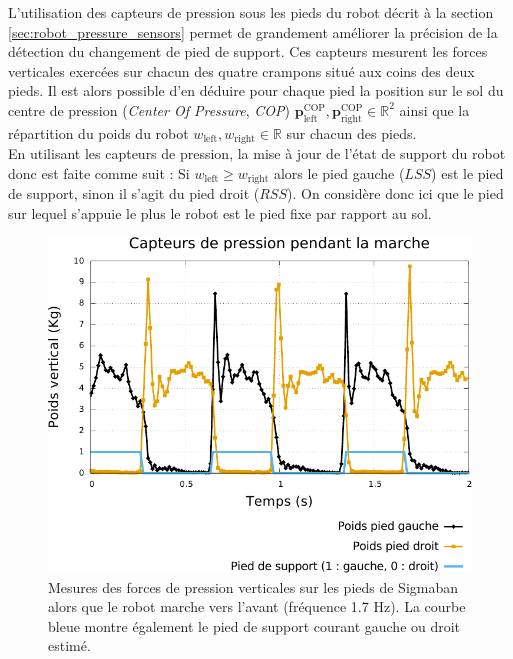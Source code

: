 L'utilisation des capteurs de pression sous les pieds du robot 
décrit à la section \ref{sec:robot_pressure_sensors} permet de grandement 
améliorer la précision de la détection du changement de pied de support.
Ces capteurs mesurent les forces verticales exercées sur chacun des quatre 
crampons situé aux coins des deux pieds.
Il est alors possible d'en déduire pour chaque pied la position
sur le sol du centre de pression (\textit{Center Of Pressure}, \textit{COP}) 
$\bm{p}_{\text{left}}^{\text{COP}},\bm{p}_{\text{right}}^{\text{COP}} \in \mathbb{R}^2$ ainsi 
que la répartition du poids du robot $w_{\text{left}}, w_{\text{right}}\in \mathbb{R}$ 
sur chacun des pieds.\\

En utilisant les capteurs de pression, la mise à jour
de l'état de support du robot donc est faite comme suit :
Si $w_{\text{left}} \geqslant w_{\text{right}}$ alors 
le pied gauche ($LSS$) est le pied de support, sinon il s'agit du pied droit ($RSS$). 
On considère donc ici que le pied sur lequel s'appuie le plus 
le robot est le pied fixe par rapport au sol.

\begin{figure}[htb]
    \begin{center}
        \includegraphics[type=pdf,ext=.pdf,read=.pdf,width=1.0\linewidth]{../plot/pressure_sensors}
        \caption{\label{fig:pressure_sensors} 
            Mesures des forces de pression verticales sur les pieds de Sigmaban
            alors que le robot marche vers l'avant (fréquence 1.7 Hz).
            La courbe bleue montre également le pied de support 
            courant gauche ou droit estimé.}
    \end{center}
\end{figure}

